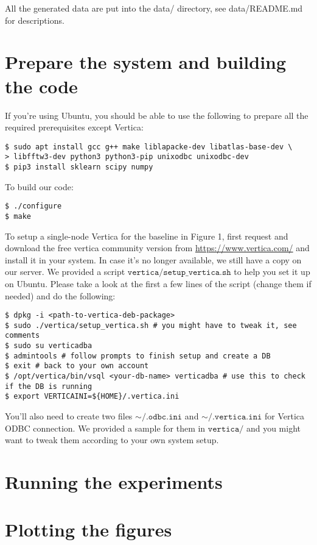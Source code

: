 \documentclass[11pt]{article}
\begin{document}
All the generated data are put into the data/ directory, see
data/README.md for descriptions.

\section{Prepare the system and building the code}
If you're using Ubuntu, you should be able to use the following to
prepare all the required prerequisites except Vertica:
\begin{verbatim}
$ sudo apt install gcc g++ make liblapacke-dev libatlas-base-dev \
> libfftw3-dev python3 python3-pip unixodbc unixodbc-dev
$ pip3 install sklearn scipy numpy
\end{verbatim}

To build our code:
\begin{verbatim}
$ ./configure
$ make
\end{verbatim}

To setup a single-node Vertica for the baseline in Figure 1, first
request and download the free vertica community version from
\url{https://www.vertica.com/} and install it in your system. In case
it's no longer available, we still have a copy on our server. We
provided a script $\texttt{vertica/setup\_vertica.sh}$ to help you set
it up on Ubuntu. Please take a look at the first a few lines of the
script (change them if needed) and do the following:
\begin{verbatim}
$ dpkg -i <path-to-vertica-deb-package>
$ sudo ./vertica/setup_vertica.sh # you might have to tweak it, see comments
$ sudo su verticadba
$ admintools # follow prompts to finish setup and create a DB
$ exit # back to your own account
$ /opt/vertica/bin/vsql <your-db-name> verticadba # use this to check if the DB is running
$ export VERTICAINI=${HOME}/.vertica.ini
\end{verbatim}
You'll also need to create two files $\mathtt{\sim/.odbc.ini}$ and
$\mathtt{\sim/.vertica.ini}$ for Vertica ODBC connection. We provided
a sample for them in $\texttt{vertica/}$ and you might want to tweak
them according to your own system setup.


\section{Running the experiments}

\section{Plotting the figures}
\end{document}
